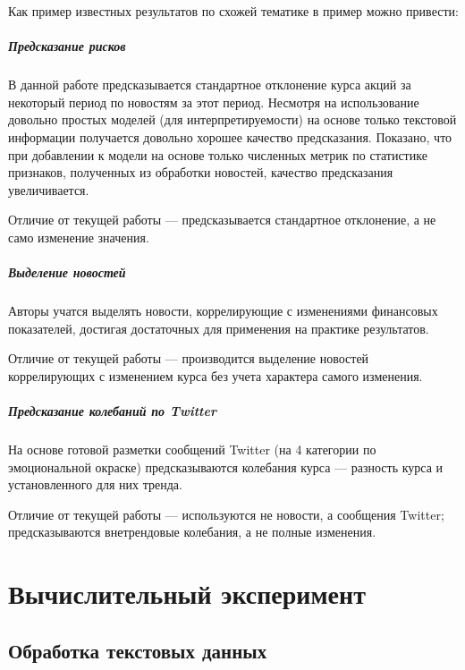 \documentclass[pdftex,ptm,12pt,a4paper]{report}
\begin{document}
\fi

Как пример известных результатов по схожей тематике в пример можно привести:

\paragraph{Предсказание рисков \cite{risk_predict}}

В данной работе предсказывается стандартное отклонение курса акций за некоторый период по новостям за этот период.
Несмотря на использование довольно простых моделей (для интерпретируемости) на основе только текстовой информации получается
довольно хорошее качество предсказания. Показано, что при добавлении к модели на основе только численных метрик по статистике
 признаков, полученных из обработки новостей, качество предсказания увеличивается.

Отличие от текущей работы --- предсказывается стандартное отклонение, а не само изменение значения.

\paragraph{Выделение новостей \cite{select_important_news}}

Авторы учатся выделять новости, коррелирующие с изменениями финансовых показателей, достигая достаточных для
применения на практике результатов.

Отличие от текущей работы --- производится выделение новостей коррелирующих с изменением курса без учета характера
самого изменения.

\paragraph{Предсказание колебаний по Twitter \cite{stock_from_twitter}}

На основе готовой разметки сообщений Twitter (на 4 категории по эмоциональной окраске) предсказываются колебания курса --- разность курса и установленного для них тренда.

Отличие от текущей работы --- используются не новости, а сообщения Twitter; предсказываются внетрендовые колебания,
а не полные изменения.

\chapter{Вычислительный эксперимент}

\section{Обработка текстовых данных}
\end{document}
